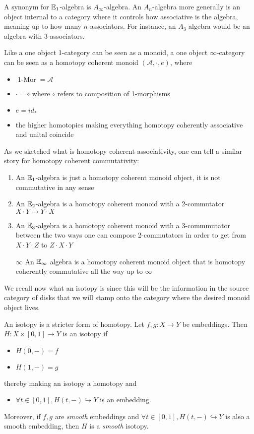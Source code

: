 \begin{notat}
    A synonym for $\mathbb{E}_1$-algebra is $A_\infty$-algebra. An $A_n$-algebra more generally is an object
     internal to a category where it controls how associative is the algebra, meaning up to how many
     $n$-associators. For instance, an $A_3$ algebra would be an algebra with 3-associators.
\end{notat}
\begin{ex}
    Like a one object 1-category can be seen as a monoid, a one object $\infty$-category 
     can be seen as a homotopy coherent monoid
     $(\mathcal{A},\cdot, e)$, where 
     \begin{itemize}
\item $\operatorname{1-Mor}=\mathcal{A}$
\item $\cdot =\circ$ where $\circ$ refers to composition of 1-morphisms
\item $e=id_\ast$
\item the higher homotopies making everything homotopy coherently associative and unital coincide
     \end{itemize}
\end{ex}
As we sketched what is homotopy coherent associativity, one can tell a similar story for homotopy
 coherent commutativity:
\begin{enumerate}
    \item An $\mathbb{E}_1$-algebra is just a homotopy coherent monoid object, it is not commutative in any sense
    \item An $\mathbb{E}_2$-algebra is a homotopy coherent monoid with a 2-commutator $X\cdot Y\to Y\cdot X$
    \item An $\mathbb{E}_3$-algebra is a homotopy coherent monoid with a 3-commmutator between the two
     ways one can compose 2-commutators in order to get from $X\cdot Y\cdot Z$ to $Z\cdot X\cdot Y$
     \item[$\infty$] An $\mathbb{E}_\infty$ algebra is a  homotopy coherent monoid object that is homotopy coherently
      commutative all the way up to $\infty$
\end{enumerate}


We recall now what an isotopy is since this will be the information in the source category of disks that
 we will
stamp onto the category where the desired monoid object lives. 

\begin{defn}[Isotopy]\label{Isotopy}
    An isotopy is a stricter form of homotopy. Let $f,g:X\to Y$ be embeddings. Then $H:X\times [0,1]\to Y$ is an isotopy if 
    \begin{itemize}
        \item $H(0,-)=f$
        \item $H(1,-)=g$
    \end{itemize}
    thereby making an isotopy a homotopy and
    \begin{itemize}
        \item $\forall t\in[0,1], H(t,-)\hookrightarrow Y$ is an embedding.
    \end{itemize}
    Moreover, if $f,g$ are \emph{smooth} embeddings and $\forall t\in[0,1], H(t,-)\hookrightarrow Y$ is also a smooth embedding, then $H$ is a \emph{smooth} isotopy.
\end{defn}

